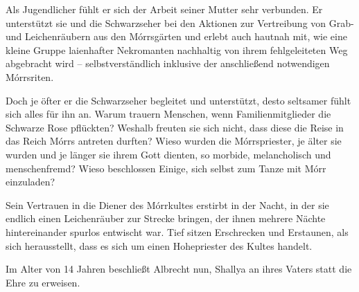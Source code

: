 Als Jugendlicher fühlt er sich der Arbeit seiner Mutter sehr verbunden. Er unterstützt sie und die Schwarzseher bei den Aktionen zur Vertreibung von Grab- und Leichenräubern aus den Mórrsgärten und erlebt auch hautnah mit, wie eine kleine Gruppe laienhafter Nekromanten nachhaltig von ihrem fehlgeleiteten Weg abgebracht wird – selbstverständlich inklusive der anschließend notwendigen Mórrsriten.

Doch je öfter er die Schwarzseher begleitet und unterstützt, desto seltsamer fühlt sich alles für ihn an. Warum trauern Menschen, wenn Familienmitglieder die Schwarze Rose pflückten? Weshalb freuten sie sich nicht, dass diese die Reise in das Reich Mórrs antreten durften? Wieso wurden die Mórrspriester, je älter sie wurden und je länger sie ihrem Gott dienten, so morbide, melancholisch und menschenfremd? Wieso beschlossen Einige, sich selbst zum Tanze mit Mórr einzuladen? 

Sein Vertrauen in die Diener des Mórrkultes erstirbt in der Nacht, in der sie endlich einen Leichenräuber zur Strecke bringen, der ihnen mehrere Nächte hintereinander spurlos entwischt war. Tief sitzen Erschrecken und Erstaunen, als sich herausstellt, dass es sich um einen Hohepriester des Kultes handelt.

Im Alter von 14 Jahren beschließt Albrecht nun, Shallya an ihres Vaters statt die Ehre zu erweisen. 